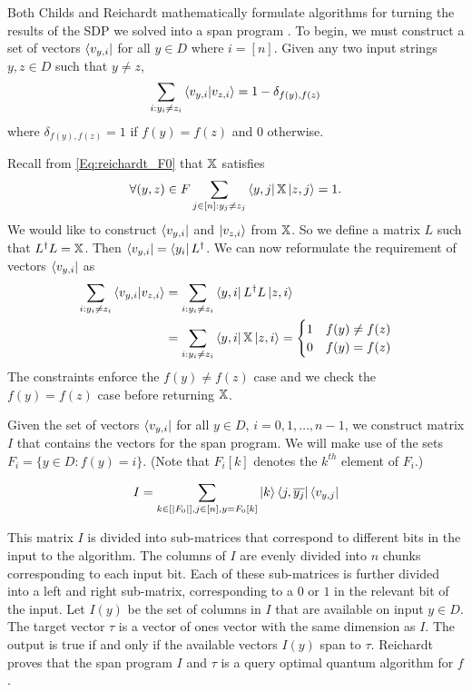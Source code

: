 Both Childs and Reichardt mathematically formulate
algorithms for turning the results of the SDP we solved
into a span program \cite{reichardt2009span, childs}.
To begin, we must construct a set of vectors
$\bra{v_{y,i}}$ for all $y \in D$ where $i = [n]$.
Given any two input strings $y, z \in D$ such that $y\neq z$,
\begin{align}
    \sum_{i: y_i \ne z_i} \braket{v_{y,i}|v_{z,i}} = 1 - \delta_{f(y), f(z)} \nonumber
\end{align}
where $\delta_{f(y), f(z)} = 1$ if $f(y) = f(z)$ and $0$ otherwise.

Recall from \cref{Eq:reichardt_F0} that $\operatorname{\mathbb{X}}$ satisfies
\begin{align}
    \forall (y,z) \in F \sum_{j \in [n]: y_j \ne z_j} 
    \bra{y,j} \operatorname{\mathbb{X}} \ket{z, j} = 1 \nonumber.
\end{align}
We would like to construct $\bra{v_{y,i}}$ and $\ket{v_{z,i}}$
from $\operatorname{\mathbb{X}}$.
So we define a matrix $L$ such that $L^\dagger L = \operatorname{\mathbb{X}}$.
Then $\bra{v_{y,i}} = \bra{y_i}L^\dagger$.
We can now reformulate the requirement of vectors $\bra{v_{y,i}}$
as
\begin{align}
    \sum_{i: y_i \ne z_i} \braket{v_{y,i}|v_{z,i}} &= \sum_{i: y_i \ne z_i}
    \bra{y,i} L^\dagger L \ket{z, i} \nonumber \\
    &= \sum_{i: y_i \ne z_i} \bra{y,i} \operatorname{\mathbb{X}} \ket{z, i} = \begin{cases}
        1 & f(y) \ne f(z) \\
        0 & f(y) = f(z)
    \end{cases} \nonumber 
\end{align}
The constraints enforce the $f(y) \neq f(z)$ case and we
check the $f(y) = f(z)$ case before returning $\operatorname{\mathbb{X}}$.

Given the set of vectors $\bra{v_{y,i}}$ for all $y \in
D$, $i = 0, 1, \ldots , n-1$, we construct 
matrix $I$ that contains the vectors for the span
program. We will make use of the sets $F_i =
\{y \in D: f(y) = i\}$.
(Note that $F_i[k]$ denotes the $k^{th}$ element of $F_i$.)

\begin{align}\label{input_vectors}
    I = \sum_{k \in [|F_0|], j \in [n], y = F_0[k]}
    \ket{k}\bra{j, \overline{y_j}} \bra{v_{y,j}}
\end{align}

This matrix $I$ is divided into sub-matrices that
correspond to different bits in the input to the
algorithm.
The columns of $I$ are evenly divided into
$n$ chunks corresponding to each input bit.
Each of these sub-matrices is further divided into a left and
right sub-matrix, corresponding to a $0$ or $1$
in the relevant bit of the input.
Let $I(y)$ be the set of columns in 
$I$ that are available on input $y \in D$.
The target vector $\tau$ 
is a vector of ones vector with the same 
dimension as $I$.
The output is true if and only if the available
vectors $I(y)$ span to $\tau$.
Reichardt proves that the span program $I$ 
and $\tau$ is a query optimal 
quantum algorithm for $f$ \cite{reichardt2009span}.
